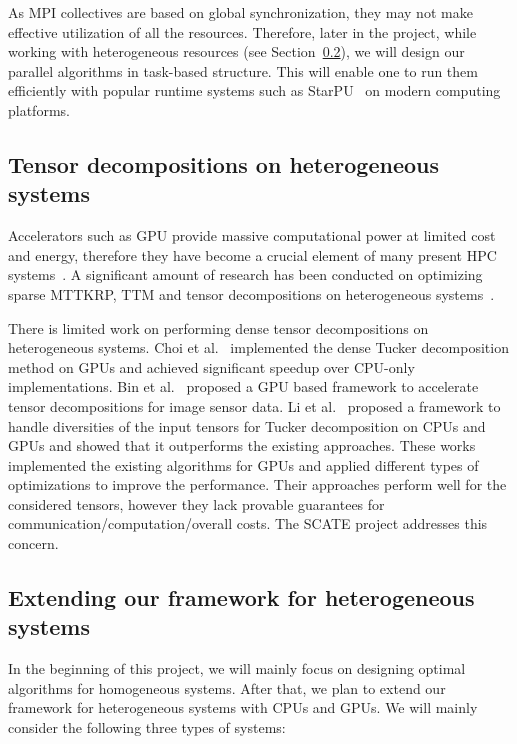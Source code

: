 \documentclass[a4paper,11pt]{article}
\newcommand{\todo}[1]{{\color{red}\rule[-.1cm]{.4cm}{.4cm}~~{
			\color{red}{TODO: #1}}}\xspace}
\begin{document}
	
	
	As MPI collectives are based on global synchronization, they may not make effective utilization of all the resources. Therefore, later in the project, while working with heterogeneous resources (see Section~\ref{sec:extension:heterogeneoussystem}), we will design our parallel algorithms in task-based structure. This will enable one to run them efficiently with popular runtime systems such as StarPU~\cite{ATNW-CCPE-2011} on modern computing platforms.
	  
	
	
	 
	
	\subsection{Tensor decompositions on heterogeneous systems}
	\label{sec:heterogeneous}
	
	Accelerators such as GPU provide massive computational power at limited cost and energy, therefore they have become a crucial element of many present HPC systems~\cite{top500}. A significant amount of research has been conducted on optimizing sparse MTTKRP, TTM and tensor decompositions on heterogeneous systems~\cite{NLSVS-IPDPS-2019,LWSD-CLUSTER-2017,parti}. 
	
	
	There is limited work on performing dense tensor decompositions on heterogeneous systems. Choi et al.~\cite{CLC-SC-2018} implemented the dense Tucker decomposition method on GPUs and achieved significant speedup over CPU-only implementations. Bin et al.~\cite{BKL-SENSORS-2020} proposed a GPU based framework to accelerate tensor decompositions for image sensor data. Li et al.~\cite{li2020atucker} proposed a framework to handle diversities of the input tensors for Tucker decomposition on CPUs and GPUs and showed that it outperforms the existing approaches. These works implemented the existing algorithms for GPUs and applied different types of optimizations to improve the performance. Their approaches perform well for the considered tensors, however they lack provable guarantees for communication/computation/overall costs. The SCATE project addresses this concern.
	
		
	\subsection{Extending our framework for heterogeneous systems}
	\label{sec:extension:heterogeneoussystem}
	In the beginning of this project, we will mainly focus on designing optimal algorithms for homogeneous systems. After that, we plan to extend our framework for heterogeneous systems with CPUs and GPUs. We will mainly consider the following three types of systems:
	
\end{document}

